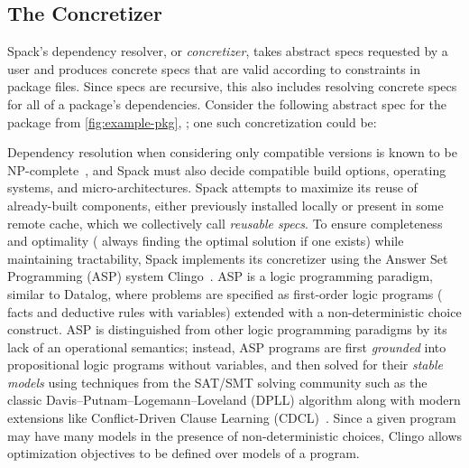 \subsection{The Concretizer}
\label{sec:spack-concretizer}
Spack's dependency resolver, or {\it concretizer}, takes abstract specs
requested by a user and produces concrete specs that are valid according
to constraints in package files. Since specs are recursive, this also
includes resolving concrete specs for all of a package's
dependencies. Consider the following abstract spec for the package from
\cref{fig:example-pkg}, ; one such concretization could be:

\begin{footnotesize}
\par\vspace{0.8em}\noindent\colorbox{whitesmoke}{\begin{minipage}{0.98\columnwidth}\end{minipage}}\vspace{0.8em}
\end{footnotesize}

Dependency resolution when considering only compatible versions is known to be
NP-complete~\cite{dicosmo2006edos,cox2016version}, and Spack must also decide
compatible build options, operating systems, and micro-architectures.  Spack
attempts to maximize its reuse of already-built components, either
previously installed locally or present in some remote cache, which we
collectively call \textit{reusable specs}. To ensure completeness and optimality
(\ie{} always finding the optimal solution if one exists) while maintaining
tractability, Spack implements its concretizer using the Answer Set Programming
(ASP) system Clingo~\cite{gebser2016potassco,gamblin2022asp}. ASP is a logic
programming paradigm, similar to Datalog, where problems are specified as
first-order logic programs (\ie{} facts and deductive rules with variables)
extended with a non-deterministic choice construct. ASP is distinguished from
other logic programming paradigms by its lack of an operational semantics;
instead, ASP programs are first \textit{grounded} into propositional logic
programs without variables, and then solved for their \textit{stable models}
using techniques from the SAT/SMT solving community such as the classic
Davis–Putnam–Logemann–Loveland (DPLL) algorithm along with modern extensions
like Conflict-Driven Clause Learning (CDCL)~\cite{davis1960computing,davis1962machine,moskewicz2001chaff}. Since a given program may have many
models in the presence of non-deterministic choices, Clingo allows
optimization objectives to be defined over models of a program.

